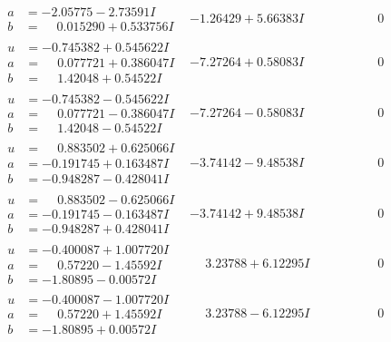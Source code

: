 \documentclass[1p]{elsarticle_modified}
\theoremstyle{definition}
\begin{document}
$$\begin{array}{c|c|c}
\begin{aligned}
a &= -2.05775 - 2.73591 I \\
b &= \phantom{-}0.015290 + 0.533756 I\end{aligned}
 & -1.26429 + 5.66383 I & \phantom{-0.000000 } 0 \\ \hline\begin{aligned}
u &= -0.745382 + 0.545622 I \\
a &= \phantom{-}0.077721 + 0.386047 I \\
b &= \phantom{-}1.42048 + 0.54522 I\end{aligned}
 & -7.27264 + 0.58083 I & \phantom{-0.000000 } 0 \\ \hline\begin{aligned}
u &= -0.745382 - 0.545622 I \\
a &= \phantom{-}0.077721 - 0.386047 I \\
b &= \phantom{-}1.42048 - 0.54522 I\end{aligned}
 & -7.27264 - 0.58083 I & \phantom{-0.000000 } 0 \\ \hline\begin{aligned}
u &= \phantom{-}0.883502 + 0.625066 I \\
a &= -0.191745 + 0.163487 I \\
b &= -0.948287 - 0.428041 I\end{aligned}
 & -3.74142 - 9.48538 I & \phantom{-0.000000 } 0 \\ \hline\begin{aligned}
u &= \phantom{-}0.883502 - 0.625066 I \\
a &= -0.191745 - 0.163487 I \\
b &= -0.948287 + 0.428041 I\end{aligned}
 & -3.74142 + 9.48538 I & \phantom{-0.000000 } 0 \\ \hline\begin{aligned}
u &= -0.400087 + 1.007720 I \\
a &= \phantom{-}0.57220 - 1.45592 I \\
b &= -1.80895 - 0.00572 I\end{aligned}
 & \phantom{-}3.23788 + 6.12295 I & \phantom{-0.000000 } 0 \\ \hline\begin{aligned}
u &= -0.400087 - 1.007720 I \\
a &= \phantom{-}0.57220 + 1.45592 I \\
b &= -1.80895 + 0.00572 I\end{aligned}
 & \phantom{-}3.23788 - 6.12295 I & \phantom{-0.000000 } 0 \\ \hline\begin{aligned}

\end{aligned}
\end{array}$$
\end{document}
